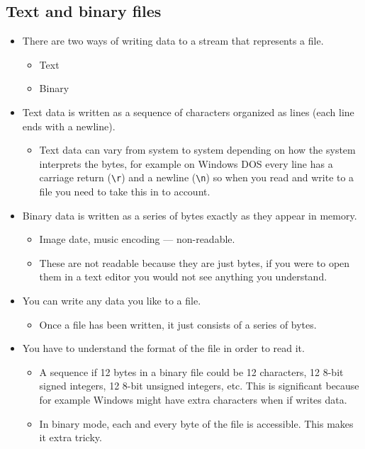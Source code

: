 \subsection{Text and binary files}
\begin{itemize}
    \item There are two ways of writing data to a stream that represents a file.
        \begin{itemize}
            \item Text 
            \item Binary
        \end{itemize}

    \item Text data is written as a sequence of characters organized as lines (each line ends with a newline).
        \begin{itemize}
            \item Text data can vary from system to system depending on how the system interprets the bytes, for example on Windows DOS every line has a carriage return (\verb|\r|) and a newline (\verb|\n|) so when you read and write to a file you need to take this in to account.
        \end{itemize}
    
    \item Binary data is written as a series of bytes exactly as they appear in memory.
        \begin{itemize}
            \item Image date, music encoding — non-readable.
            \item These are not readable because they are just bytes, if you were to open them in a text editor you would not see anything you understand.
        \end{itemize}
    
    \item You can write any data you like to a file.
        \begin{itemize}
            \item Once a file has been written, it just consists of a series of bytes.
        \end{itemize}
    
    \item You have to understand the format of the file in order to read it.
        \begin{itemize}
            \item A sequence if 12 bytes in a binary file could be 12 characters, 12 8-bit signed integers, 12 8-bit unsigned integers, etc. This is significant because for example Windows might have extra characters when if writes data. 
            \item In binary mode, each and every byte of the file is accessible. This makes it extra tricky.
        \end{itemize}
\end{itemize}

